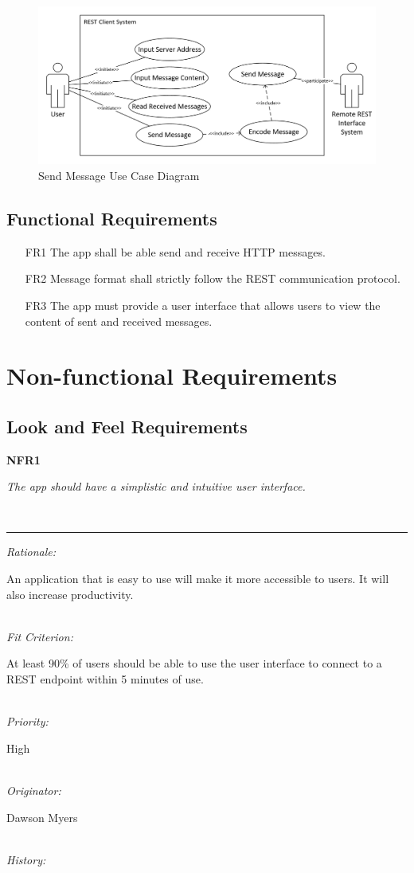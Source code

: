 \documentclass[12pt, titlepage]{article}
\newcommand{\pbox}[1]{\parbox[t]{.85\linewidth}{#1}
}
\newcommand{\myline}{%
	\kern1pt %
	\hrule height 0.8pt
	\kern3pt %
}
\newcommand{\requirement}[7]{

	\noindent
	\vspace{5pt}
	\parbox{\linewidth}{
		\fontsize{10pt}{5pt}\selectfont
		\noindent\textbf{#1} \hspace{26pt}\pbox{\textit{#2}} \\
		\myline
		\textit{Rationale:}	\hspace{10pt} \pbox{#3} \\
		\textit{Fit Criterion:} \pbox{#4} \\
		\textit{Priority:} \hspace{18pt} \pbox{#5} \\
		\textit{Originator:} \hspace{7pt} \pbox{#6} \\
		\textit{History:} \hspace{25pt}{#7} \\
}}
\begin{document}
\begin{center}
	\begin{figure}[h!]
		\includegraphics[width=0.8\linewidth, center]{images/srs-use-case-send-msg}
		\caption{Send Message Use Case Diagram}
		\label{image:usecase}
	\end{figure}
\end{center}


\subsection{Functional Requirements}
\begin{enumerate}
	\item[FR1] The app shall be able send and receive HTTP messages.
	\item[FR2] Message format shall strictly follow the REST communication protocol.
	\item[FR3] The app must provide a user interface that allows users to view the content of sent and received messages.
	
\end{enumerate}
\section{Non-functional Requirements}


\subsection{Look and Feel Requirements}
\requirement{NFR1}{The app should have a simplistic and intuitive user interface.}
{An application that is easy to use will make it more accessible to users. It will also increase productivity.}
{At least 90\% of users should be able to use the user interface to connect to a REST endpoint within 5 minutes of use.}{High}{Dawson Myers}{October 6, 2017}
\end{document}

